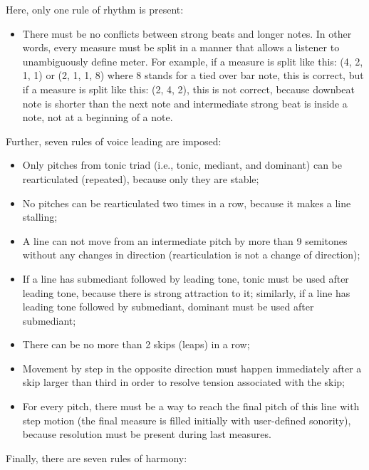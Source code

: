 \documentclass{article}
\begin{document}
Here, only one rule of rhythm is present:
\begin{itemize}
	\item There must be no conflicts between strong beats and longer notes. In other words, every measure must be split in a manner that allows a listener to unambiguously define meter. For example, if a measure is split like this: (4, 2, 1, 1) or (2, 1, 1, 8) where 8 stands for a tied over bar note, this is correct, but if a measure is split like this: (2, 4, 2), this is not correct, because downbeat note is shorter than the next note and intermediate strong beat is inside a note, not at a beginning of a note.
\end{itemize}
Further, seven rules of voice leading are imposed:
\begin{itemize}
	\item Only pitches from tonic triad (i.e., tonic, mediant, and dominant) can be rearticulated (repeated), because only they are stable;
	\item No pitches can be rearticulated two times in a row, because it makes a line stalling;
	\item A line can not move from an intermediate pitch by more than 9 semitones without any changes in direction (rearticulation is not a change of direction);
	\item If a line has submediant followed by leading tone, tonic must be used after leading tone, because there is strong attraction to it; similarly, if a line has leading tone followed by submediant, dominant must be used after submediant;
	\item There can be no more than 2 skips (leaps) in a row;
	\item Movement by step in the opposite direction must happen immediately after a skip larger than third in order to resolve tension associated with the skip;
	\item For every pitch, there must be a way to reach the final pitch of this line with step motion (the final measure is filled initially with user-defined sonority), because resolution must be present during last measures.
\end{itemize}
Finally, there are seven rules of harmony:
\end{document}
